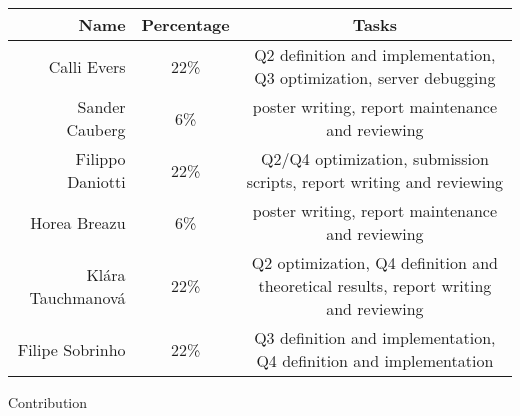 \begin{tabular}{r c c }
    \toprule
    \textbf{Name} & \textbf{Percentage} & \textbf{Tasks} \\
    \midrule
    Calli Evers &22\% & Q2 definition and implementation, Q3 optimization, server debugging \\ 
    Sander Cauberg & 6\%& poster writing, report maintenance and reviewing\\
    Filippo Daniotti & 22\%& Q2/Q4 optimization, submission scripts, report writing and reviewing \\
    Horea Breazu &6\% & poster writing, report maintenance and reviewing\\
    Klára Tauchmanová & 22\% & Q2 optimization, Q4 definition and theoretical results, report writing and reviewing \\
    Filipe Sobrinho & 22\% & Q3 definition and implementation, Q4 definition and implementation \\
    \bottomrule
\end{tabular}
\caption{Contribution}
\label{tab:contribution}